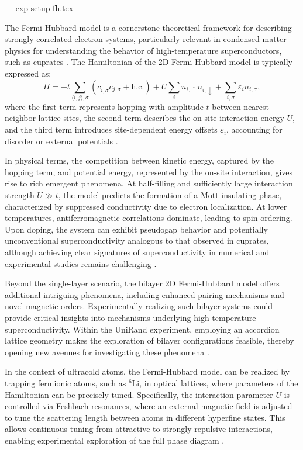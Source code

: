--- exp-setup-fh.tex ---

The Fermi-Hubbard model is a cornerstone theoretical framework for describing strongly correlated electron systems, particularly relevant in condensed matter physics for understanding the behavior of high-temperature superconductors, such as cuprates \cite{koepsell_quantum_2021}. The Hamiltonian of the 2D Fermi-Hubbard model is typically expressed as:
\begin{equation}
H = -t \sum_{\langle i,j \rangle, \sigma} \left( c_{i,\sigma}^\dagger c_{j,\sigma} + \text{h.c.} \right) + U \sum_i n_{i,\uparrow} n_{i,\downarrow} + \sum_{i,\sigma} \varepsilon_i n_{i,\sigma},
\label{eq:fermi-hubbard}
\end{equation}
where the first term represents hopping with amplitude $t$ between nearest-neighbor lattice sites, the second term describes the on-site interaction energy $U$, and the third term introduces site-dependent energy offsets $\varepsilon_i$, accounting for disorder or external potentials \cite{koepsell_quantum_2021}.

In physical terms, the competition between kinetic energy, captured by the hopping term, and potential energy, represented by the on-site interaction, gives rise to rich emergent phenomena. At half-filling and sufficiently large interaction strength $U \gg t$, the model predicts the formation of a Mott insulating phase, characterized by suppressed conductivity due to electron localization. At lower temperatures, antiferromagnetic correlations dominate, leading to spin ordering. Upon doping, the system can exhibit pseudogap behavior and potentially unconventional superconductivity analogous to that observed in cuprates, although achieving clear signatures of superconductivity in numerical and experimental studies remains challenging \cite{koepsell_quantum_2021}.

Beyond the single-layer scenario, the bilayer 2D Fermi-Hubbard model offers additional intriguing phenomena, including enhanced pairing mechanisms and novel magnetic orders. Experimentally realizing such bilayer systems could provide critical insights into mechanisms underlying high-temperature superconductivity. Within the UniRand experiment, employing an accordion lattice geometry makes the exploration of bilayer configurations feasible, thereby opening new avenues for investigating these phenomena \cite{huang_construction_2024}.

In the context of ultracold atoms, the Fermi-Hubbard model can be realized by trapping fermionic atoms, such as $^6$Li, in optical lattices, where parameters of the Hamiltonian can be precisely tuned. Specifically, the interaction parameter $U$ is controlled via Feshbach resonances, where an external magnetic field is adjusted to tune the scattering length between atoms in different hyperfine states. This allows continuous tuning from attractive to strongly repulsive interactions, enabling experimental exploration of the full phase diagram \cite{culemann_construction_2024}.

